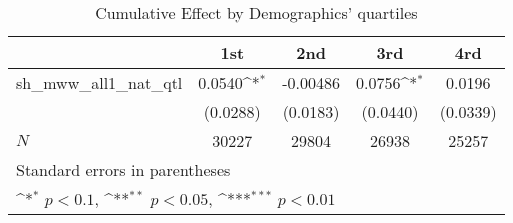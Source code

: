 \begin{table}[htbp]\centering
\def\sym#1{\ifmmode^{#1}\else\(^{#1}\)\fi}
\caption{Cumulative Effect by Demographics' quartiles}
\begin{tabular}{l*{4}{c}}
\hline\hline
            &\multicolumn{1}{c}{1st}&\multicolumn{1}{c}{2nd}&\multicolumn{1}{c}{3rd}&\multicolumn{1}{c}{4rd}\\
\hline
sh\_mww\_all1\_nat\_qtl&      0.0540\sym{*}  &    -0.00486         &      0.0756\sym{*}  &      0.0196         \\
            &    (0.0288)         &    (0.0183)         &    (0.0440)         &    (0.0339)         \\
\hline
\(N\)       &       30227         &       29804         &       26938         &       25257         \\
\hline\hline
\multicolumn{5}{l}{\footnotesize Standard errors in parentheses}\\
\multicolumn{5}{l}{\footnotesize \sym{*} \(p<0.1\), \sym{**} \(p<0.05\), \sym{***} \(p<0.01\)}\\
\end{tabular}
\end{table}
